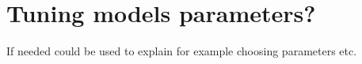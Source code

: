 \chapter{Tuning models parameters?}\label{appA}
\thispagestyle{plain}


If needed could be used to explain for example choosing parameters etc.

